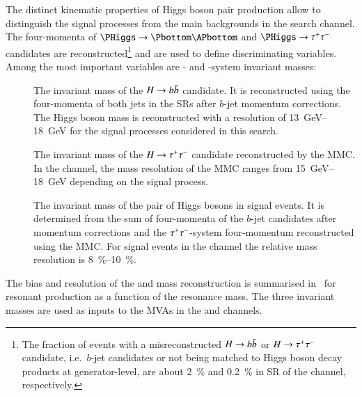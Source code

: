 The distinct kinematic properties of Higgs boson pair production allow
to distinguish the signal processes from the main backgrounds in the
\bbtautau search channel. The four-momenta of
$\PHiggs \ra \Pbottom\APbottom$ and $\PHiggs \ra \tautau$ candidates
are reconstructed\footnote{The fraction of events with a
  misreconstructed $H \to b\bar{b}$ or $H \to \tau^{+} \tau^{-}$ candidate, i.e.\
  $b$-jet candidates or \tauhadvis not being matched to Higgs boson
  decay products at generator-level, are about \SI{2}{\percent} and
  \SI{0.2}{\percent} in SR of the \hadhad channel,
  respectively.}  and are used to define discriminating variables.
Among the most important variables are \PHiggs- and \HH-system
invariant masses:
\begin{description}

\item[\mBB] The invariant mass of the $H \to b\bar{b}$ candidate. It is
  reconstructed using the four-momenta of both \btagged jets in the
  SRs after $b$-jet momentum corrections. The Higgs boson
  mass is reconstructed with a resolution of \SIrange{13}{18}{\GeV}
  for the signal processes considered in this search.

\item[\mMMC] The invariant mass of the $H \to \tau^{+} \tau^{-}$ candidate
  reconstructed by the MMC. In the \hadhad channel, the mass
  resolution of the MMC ranges from \SIrange{15}{18}{\GeV} depending
  on the signal process.

\item[\mHH] The invariant mass of the pair of Higgs bosons in signal
  events. It is determined from the sum of four-momenta of the $b$-jet
  candidates after momentum corrections and the $\tau^{+} \tau^{-}$-system
  four-momentum reconstructed using the MMC. For signal events in the
  \hadhad channel the relative mass resolution is
  \SIrange{8}{10}{\percent}.

\end{description}
The bias and resolution of the \PHiggs and \HH mass reconstruction is
summarised in~\Cref{fig:mass_reconstruction} for resonant \HH
production as a function of the resonance mass. The three invariant
masses are used as inputs to the MVAs in the \hadhad and \lephad
channels.


